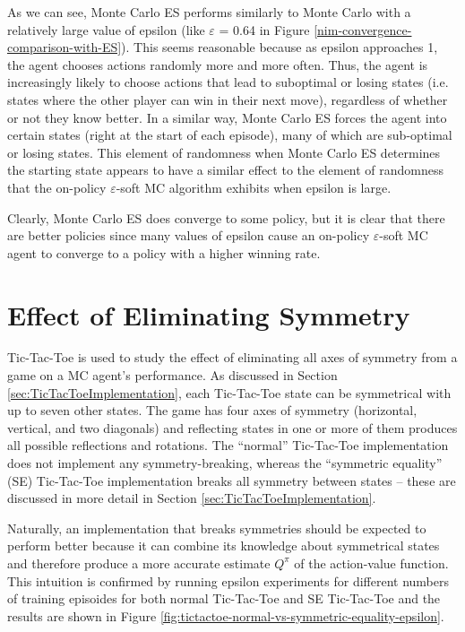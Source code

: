 \documentclass[11pt,a4paper]{report}
\begin{document}
As we can see, Monte Carlo ES performs similarly to Monte Carlo with a relatively large value of epsilon (like $\varepsilon$ = 0.64 in Figure \ref{nim-convergence-comparison-with-ES}). This seems reasonable because as epsilon approaches 1, the agent chooses actions randomly more and more often. Thus, the agent is increasingly likely to choose actions that lead to suboptimal or losing states (i.e. states where the other player can win in their next move), regardless of whether or not they know better. In a similar way, Monte Carlo ES forces the agent into certain states (right at the start of each episode), many of which are sub-optimal or losing states. This element of randomness when Monte Carlo ES determines the starting state appears to have a similar effect to the element of randomness that the on-policy $\varepsilon$-soft MC algorithm exhibits when epsilon is large.

Clearly, Monte Carlo ES does converge to some policy, but it is clear that there are better policies since many values of epsilon cause an on-policy $\varepsilon$-soft MC agent to converge to a policy with a higher winning rate.


\section{Effect of Eliminating Symmetry}

Tic-Tac-Toe is used to study the effect of eliminating all axes of symmetry from a game on a MC agent's performance. As discussed in Section \ref{sec:TicTacToeImplementation}, each Tic-Tac-Toe state can be symmetrical with up to seven other states. The game has four axes of symmetry (horizontal, vertical, and two diagonals) and reflecting states in one or more of them produces all possible reflections and rotations. The ``normal'' Tic-Tac-Toe implementation does not implement any symmetry-breaking, whereas the ``symmetric equality'' (SE) Tic-Tac-Toe implementation breaks all symmetry between states -- these are discussed in more detail in Section \ref{sec:TicTacToeImplementation}.

Naturally, an implementation that breaks symmetries should be expected to perform better because it can combine its knowledge about symmetrical states and therefore produce a more accurate estimate $Q^{\pi}$ of the action-value function. This intuition is confirmed by running epsilon experiments for different numbers of training episoides for both normal Tic-Tac-Toe and SE Tic-Tac-Toe and the results are shown in Figure \ref{fig:tictactoe-normal-vs-symmetric-equality-epsilon}.
\end{document}

